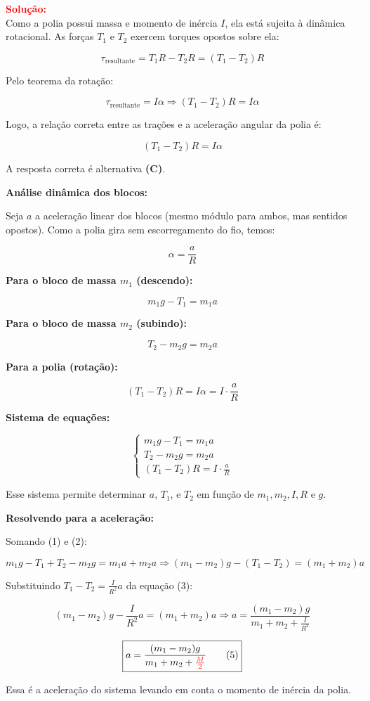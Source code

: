 \begin{flushleft}
\vspace{0.5cm}

\textcolor{red}{\textbf{Solução:}}\\

Como a polia possui massa e momento de inércia \( I \), ela está sujeita à dinâmica rotacional. As forças \( T_1 \) e \( T_2 \) exercem torques opostos sobre ela:

\[
\tau_{\text{resultante}} = T_1 R - T_2 R = (T_1 - T_2)R
\]

Pelo teorema da rotação:

\[
\tau_{\text{resultante}} = I\alpha
\Rightarrow (T_1 - T_2)R = I\alpha
\]

Logo, a relação correta entre as trações e a aceleração angular da polia é:

\[
\boxed{(T_1 - T_2)R = I\alpha}
\]

A resposta correta é alternativa \colorbox{green!50}{\textbf{(C)}}.

\vspace{0.5cm}
\textbf{Análise dinâmica dos blocos:}

Seja \( a \) a aceleração linear dos blocos (mesmo módulo para ambos, mas sentidos opostos). Como a polia gira sem escorregamento do fio, temos:

\[
\alpha = \frac{a}{R}
\]

\textbf{Para o bloco de massa \( m_1 \) (descendo):}

\[
m_1 g - T_1 = m_1 a \tag{1}
\]

\textbf{Para o bloco de massa \( m_2 \) (subindo):}

\[
T_2 - m_2 g = m_2 a \tag{2}
\]

\textbf{Para a polia (rotação):}

\[
(T_1 - T_2)R = I\alpha = I \cdot \frac{a}{R} \tag{3}
\]

\textbf{Sistema de equações:}

\[
\begin{cases}
m_1 g - T_1 = m_1 a \\
T_2 - m_2 g = m_2 a \\
(T_1 - T_2)R = I \cdot \frac{a}{R}
\end{cases}
\]

Esse sistema permite determinar \( a \), \( T_1 \), e \( T_2 \) em função de \( m_1, m_2, I, R \) e \( g \).

\textbf{Resolvendo para a aceleração:}

Somando (1) e (2):

\[
m_1 g - T_1 + T_2 - m_2 g = m_1 a + m_2 a \Rightarrow (m_1 - m_2)g - (T_1 - T_2) = (m_1 + m_2)a \tag{4}
\]

Substituindo \( T_1 - T_2 = \frac{I}{R^2}a \) da equação (3):

\[
(m_1 - m_2)g - \frac{I}{R^2}a = (m_1 + m_2)a
\Rightarrow a = \frac{(m_1 - m_2)g}{m_1 + m_2 + \frac{I}{R^2}} \tag{5}
\]

\[
\boxed{
a = \frac{(m_1 - m_2)g}{m_1 + m_2 + \textcolor{red}{\frac{M}{2}}} \tag{5}
}
\]

Essa é a aceleração do sistema levando em conta o momento de inércia da polia.


\end{flushleft}

